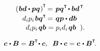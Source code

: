 \begin{otherlanguage}{russian}
\nopagebreak\vspace{-0.2em}\begin{equation*}\begin{array}{r@{\hspace{.3em}}c@{\hspace{.3em}}l}
\left(\hspace{.1ex} \bm{b}\bm{d} \dotp \bm{p}\bm{q} \hspace{.1ex}\right)^{\hspace{-0.1ex}\T} & \hspace{-0.5ex} = & \hspace{-0.1ex} \bm{p}\bm{q}^{\T} \hspace{-0.25ex} \dotp \bm{b}\bm{d}^{\hspace{.25ex}\T}
\\[.2em]
d_i p_i \hspace{.25ex} \bm{b}\bm{q}^{\T} & \hspace{-0.5ex} = & \hspace{-0.1ex} \bm{q}\bm{p} \dotp \bm{d} \bm{b}
\\[.1em]
d_i p_i \hspace{.25ex} \bm{q}\bm{b} & = & p_i d_i \hspace{.25ex} \bm{q}\bm{b} \;\; ).
\end{array}\end{equation*}

\end{otherlanguage}


\nopagebreak\vspace{-0.2em}\begin{equation}\label{vectortensordotproduct}
\bm{c} \hspace{.1ex} \dotp \bm{B} = \bm{B}^{\T} \hspace{-0.4ex} \dotp \bm{c} , \;\;
\bm{B} \dotp \bm{c} = \bm{c} \hspace{.2ex} \dotp \bm{B}^{\T} \hspace{-0.3ex} .
\end{equation}



